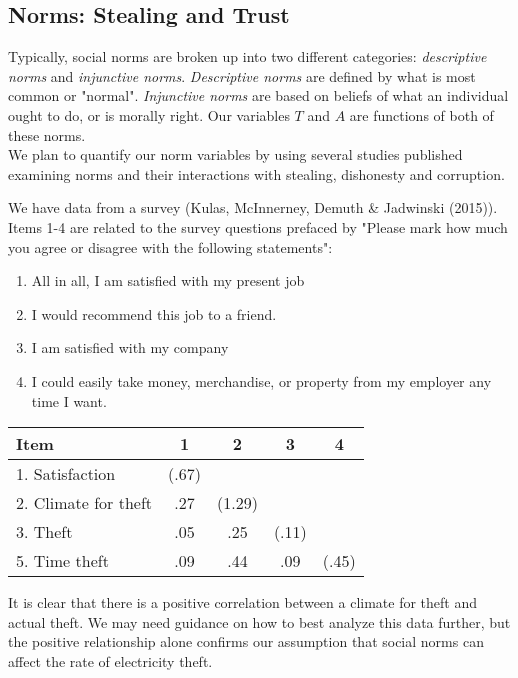 \documentclass{article}
\begin{document}
\subsection{Norms: Stealing and Trust}

Typically, social norms are broken up into two different categories: 
\textit{descriptive norms} and \textit{injunctive norms}. \textit{Descriptive norms} are defined by what is most common or "normal". \textit{Injunctive norms} are based on beliefs of what an individual ought to do, or is morally right. Our variables $T$ and $A$ are functions of both of these norms.
\\
We plan to quantify our norm variables by using several studies published examining norms and their interactions with stealing, dishonesty and corruption. 

We have data from a survey (Kulas, McInnerney, Demuth \& Jadwinski (2015)). Items 1-4 are related to the survey questions prefaced by "Please mark how much you agree or disagree with the following statements": 
\begin{enumerate}
\item All in all, I am satisfied with my present job
\item I would recommend this job to a friend.
\item I am satisfied with my company
\item I could easily take money, merchandise, or property from my employer any time I want.
\end{enumerate}
\begin{center}
\begin{tabular}[h]{l|c|c|c|c}
Item & 1 & 2 & 3 & 4\\
\hline
1. Satisfaction & (.67) & & & \\
\hline
2. Climate for theft & .27 & (1.29) & & \\
\hline
3. Theft & .05 & .25 & (.11)& \\
\hline
5. Time theft & .09 & .44 & .09 & (.45) \\

\end{tabular}

\end{center}

It is clear that there is a positive correlation between a climate for theft and actual theft. We may need guidance on how to best analyze this data further, but the positive relationship alone confirms our assumption that social norms can affect the rate of electricity theft. 
\end{document}
